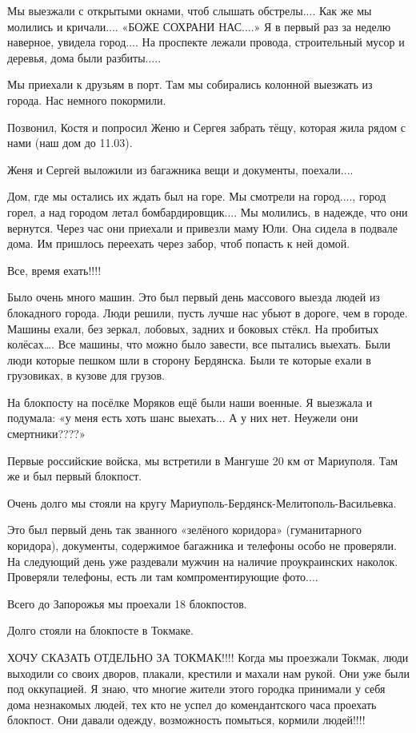Мы выезжали с открытыми окнами, чтоб слышать обстрелы.... Как же мы молились и
кричали.... «БОЖЕ СОХРАНИ НАС....» Я в первый раз за неделю наверное, увидела
город.... На проспекте лежали провода, строительный мусор и деревья, дома были
разбиты.....

Мы приехали к друзьям в порт. Там мы собирались колонной выезжать из города.
Нас немного покормили. 

Позвонил, Костя и попросил Женю и Сергея забрать тёщу, которая жила рядом с
нами (наш дом до 11.03). 

Женя и Сергей выложили из багажника вещи и документы, поехали....

Дом, где мы остались их ждать был на горе. Мы смотрели на город...., город горел,
а над городом летал бомбардировщик.... Мы молились, в надежде, что они вернутся.
Через час они приехали и привезли маму Юли. Она сидела в подвале дома. Им
пришлось переехать через забор, чтоб попасть к ней домой. 

Все, время ехать!!!!

Было очень много машин. Это был первый день массового выезда людей из
блокадного города. Люди решили, пусть лучше нас убьют в дороге, чем в городе.
Машины ехали, без зеркал, лобовых, задних и боковых стёкл. На пробитых
колёсах…. Все машины, что можно было завести, все пытались выехать. Были люди
которые пешком шли в сторону Бердянска. Были те которые ехали в грузовиках, в
кузове для грузов.

На блокпосту на посёлке Моряков ещё были наши военные. Я выезжала и подумала:
«у меня есть хоть шанс выехать... А у них нет. Неужели они смертники????»

Первые российские войска, мы встретили в Мангуше 20 км от Мариуполя. Там же и
был первый блокпост. 

Очень долго мы стояли на кругу Мариуполь-Бердянск-Мелитополь-Васильевка. 

Это был первый день так званного «зелёного коридора» (гуманитарного коридора),
документы, содержимое багажника и телефоны особо не проверяли. На следующий
день уже раздевали мужчин на наличие проукраинских наколок. Проверяли телефоны,
есть ли там компроментирующие фото....

Всего до Запорожья мы проехали 18 блокпостов. 

Долго стояли на блокпосте в Токмаке.

ХОЧУ СКАЗАТЬ ОТДЕЛЬНО ЗА ТОКМАК!!!! Когда мы проезжали Токмак, люди выходили со
своих дворов, плакали, крестили и махали нам рукой. Они уже были под
оккупацией. Я знаю, что многие жители этого городка принимали у себя дома
незнакомых людей, тех кто не успел до комендантского часа проехать блокпост.
Они давали одежду, возможность помыться, кормили людей!!!! 

